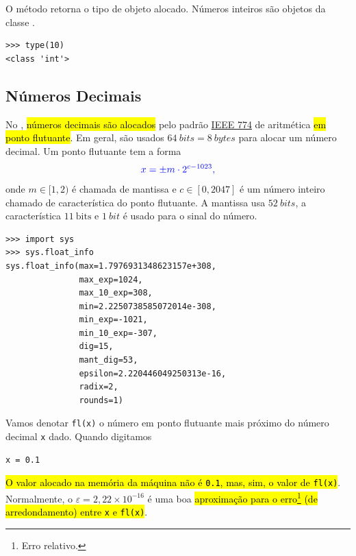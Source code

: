 \begin{obs}
  O método {\python} {\PYTHONtype} retorna o tipo de objeto alocado. Números inteiros são objetos da classe {\PYTHONint}.

\begin{lstlisting}
>>> type(10)
<class 'int'>
\end{lstlisting}

\end{obs}

\subsection{Números Decimais}\label{cap_lingua_sec_numop:subsec:float}

No {\python}, \hl{números decimais são alocados} pelo padrão \href{https://en.wikipedia.org/wiki/IEEE\_754}{IEEE 774} de aritmética \hl{em ponto flutuante}. Em geral, são usados $64~\textit{bits} = 8~\textit{bytes}$ para alocar um número decimal. Um ponto flutuante tem a forma
\begin{equation}\color{blue}x = \pm m\cdot 2^{c-1023},
\end{equation}
onde $m\in [1,2)$ é chamada de mantissa e $c\in [0, 2047]$ é um número inteiro chamado de característica do ponto flutuante. A mantissa usa $52~\textit{bits}$, a característica $11~\text{bits}$ e $1~\textit{bit}$ é usado para o sinal do número.

\begin{lstlisting}
>>> import sys
>>> sys.float_info
sys.float_info(max=1.7976931348623157e+308, 
               max_exp=1024, 
               max_10_exp=308, 
               min=2.2250738585072014e-308, 
               min_exp=-1021, 
               min_10_exp=-307, 
               dig=15, 
               mant_dig=53, 
               epsilon=2.220446049250313e-16, 
               radix=2, 
               rounds=1)
\end{lstlisting}

Vamos denotar \texttt{fl(x)} o número em ponto flutuante mais próximo do número decimal \texttt{x} dado. Quando digitamos

\begin{lstlisting}
x = 0.1
\end{lstlisting}

\hl{O valor alocado na memória da máquina não é \texttt{0.1}, mas, sim, o valor de \texttt{fl(x)}}. Normalmente, o  $\varepsilon = 2,22\times 10^{-16}$ é uma boa \hl{aproximação para o erro\footnote{Erro relativo.} (de arredondamento) entre \texttt{x} e \texttt{fl(x)}}.

